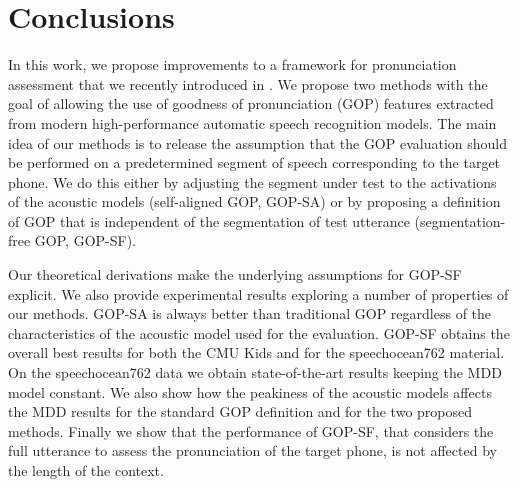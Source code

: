 \section{Conclusions}
\label{sec:conclusions}
In this work, we propose improvements to a framework for pronunciation assessment that we recently introduced in \cite{cao24b_interspeech}.
We propose two methods with the goal of allowing the use of goodness of pronunciation (GOP) features extracted from modern high-performance automatic speech recognition models.
The main idea of our methods is to release the assumption that the GOP evaluation should be performed on a predetermined segment of speech corresponding to the target phone.
We do this either by adjusting the segment under test to the activations of the acoustic models (self-aligned GOP, GOP-SA) or by proposing a definition of GOP that is independent of the segmentation of test utterance (segmentation-free GOP, GOP-SF).

Our theoretical derivations make the underlying assumptions for GOP-SF explicit.
We also provide experimental results exploring a number of properties of our methods.
GOP-SA is always better than traditional GOP regardless of the characteristics of the acoustic model used for the evaluation.
GOP-SF obtains the overall best results for both the CMU Kids and for the speechocean762 material.
On the speechocean762 data we obtain state-of-the-art results keeping the MDD model constant.
We also show how the peakiness of the acoustic models affects the MDD results for the standard GOP definition and for the two proposed methods.
Finally we show that the performance of GOP-SF, that considers the full utterance to assess the pronunciation of the target phone, is not affected by the length of the context.

